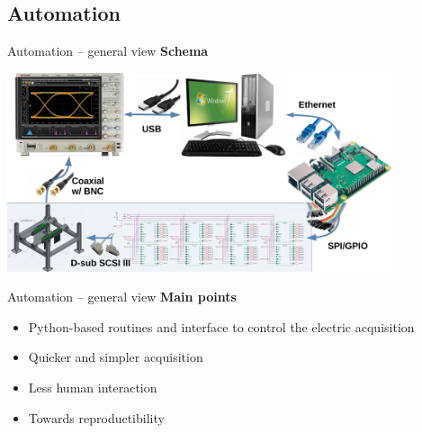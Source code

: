 \documentclass[utf8]{beamer} \usetheme{lfcr} %
\begin{document}
\subsection{Automation}
\begin{frame}{Automation -- general view}
  \textbf{Schema}
  \begin{center}
    \includegraphics[width=0.85\textwidth]{schema.pdf}
  \end{center}

\end{frame}

\begin{frame}{Automation -- general view}
  \textbf{Main points}
  \begin{itemize}
   \item {Python-based routines and interface to control the electric acquisition}
    \item {Quicker and simpler acquisition}
    \item {Less human interaction}
    \item {Towards reproductibility}
  \end{itemize}
\end{frame}
%
\end{document}
